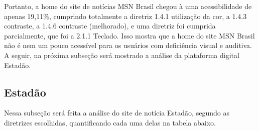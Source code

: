 \documentclass[a4paper]{article}
\begin{document}
\begin{titlepage}
Portanto, a home do site de notícias MSN Brasil chegou à uma acessibilidade de apenas 19,11\%, cumprindo totalmente a diretriz 1.4.1 utilização da cor, a 1.4.3 contraste, a 1.4.6 contraste (melhorado), e uma diretriz foi cumprida parcialmente, que foi a  2.1.1 Teclado. Isso mostra que a home do site MSN Brasil não é nem um pouco acessível para os usuários com deficiência visual e auditiva. A seguir, na próxima subseção será mostrado a análise da plataforma digital Estadão.

\subsection{Estadão}

Nessa subseção será feita a análise do site de notícia Estadão, segundo as diretrizes escolhidas, quantificando cada uma delas na tabela abaixo.\\


\end{titlepage}
\end{document}
